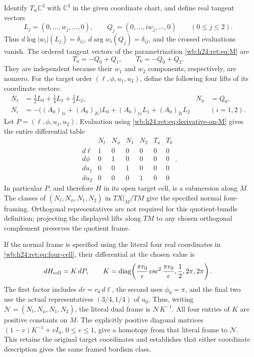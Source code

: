 Identify \(T_w\mathbb C^3\) with \(\mathbb C^3\) in the given coordinate chart,
and define real tangent vectors
\begin{equation}
 L_j=(0,\ldots,w_j,\ldots,0),\qquad
 Q_j=(0,\ldots,iw_j,\ldots,0)\qquad(0\leq j\leq2).
 \label{wb:h24:ret:eq:LQ}
\end{equation}
Thus \(d\log|w_i|(L_j)=\delta_{ij}\),
\(d\arg w_i(Q_j)=\delta_{ij}\), and the crossed evaluations vanish.
The ordered tangent vectors of the parametrization \eqref{wb:h24:ret:eq:M} are
\begin{equation}
 T_a=-Q_0+Q_1,\qquad T_b=-Q_0+Q_2.
 \label{wb:h24:ret:eq:tangents}
\end{equation}
They are independent because their \(w_1\) and \(w_2\) components,
respectively, are nonzero.  For the target order
\((\ell,\phi,u_1,u_2)\), define the following four lifts of its
coordinate vectors:
\begin{align}
 N_\ell&=\tfrac12L_0+\tfrac14L_1+\tfrac14L_2,
       &N_\phi&=Q_0,\label{wb:h24:ret:eq:normal-first}\\
 N_i&=-\bigl((A_0)_{1i}+(A_0)_{2i}\bigr)L_0
           +(A_0)_{1i}L_1+(A_0)_{2i}L_2
       &&(i=1,2).\label{wb:h24:ret:eq:normal-u}
\end{align}
Let \(P=(\ell,\phi,u_1,u_2)\).  Evaluation using
\eqref{wb:h24:ret:eq:derivative-on-M} gives the entire differential table
\begin{equation}
\begin{array}{c|rrrrrr}
 &N_\ell&N_\phi&N_1&N_2&T_a&T_b\\\hline
 d\ell&1&0&0&0&0&0\\
 d\phi&0&1&0&0&0&0\\
 du_1&0&0&1&0&0&0\\
 du_2&0&0&0&1&0&0
\end{array}.
 \label{wb:h24:ret:eq:differential-table}
\end{equation}
In particular \(P\), and therefore \(H\) in its open target cell,
is a submersion along \(M\).  The classes of
\((N_\ell,N_\phi,N_1,N_2)\) in \(TX|_M/TM\) give the specified
normal four-framing.  Orthogonal representatives are not required for
this quotient-bundle definition; projecting the displayed lifts along
\(TM\) to any chosen orthogonal complement preserves the quotient
frame.

If the normal frame is specified using the literal four real coordinates
in \eqref{wb:h24:ret:eq:four-cell}, their differential at the chosen value is
\[
 dH_{\rm cell}=K\,dP,\qquad
 K=\operatorname{diag}\!\left(
 \frac{\pi r_0}{\epsilon}\csc^2\frac{\pi r_0}{\epsilon},
 \frac12,2\pi,2\pi\right).
\]
The first factor includes \(dr=r_0\,d\ell\), the second uses
\(\phi_0=\pi\), and the final two use the actual representatives
\((3/4,1/4)\) of \(u_0\). Thus, writing
\(\mathcal N=(N_\ell,N_\phi,N_1,N_2)\), the literal dual frame is
\(\mathcal N K^{-1}\). All four entries of \(K\) are positive
constants on \(M\). The explicitly positive diagonal matrices
\((1-v)K^{-1}+vI_4\), \(0\leq v\leq1\), give a homotopy
from that literal frame to \(\mathcal N\). This retains the original
target coordinates and establishes that either coordinate description
gives the same framed bordism class.

